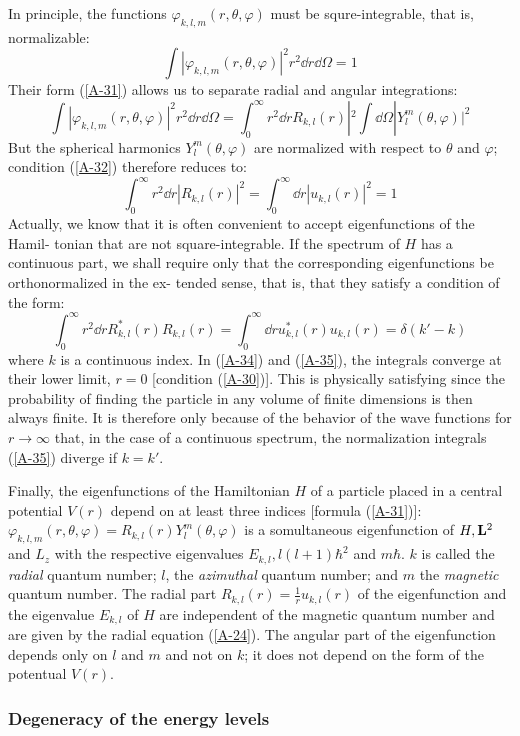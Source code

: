 In principle, the functions $\varphi_{k,l,m}(r,\theta,\varphi)$ must be squre-integrable, that is, normalizable:
\begin{equation}\label{A-32}
	\int |\varphi_{k,l,m}(r,\theta,\varphi)|^2r^2\dd r\dd \Omega = 1
\end{equation}
Their form (\ref{A-31}) allows us to separate radial and angular integrations:
\begin{equation}\label{A-33}
	\int |\varphi_{k,l,m}(r,\theta,\varphi)|^2r^2\dd r\dd \Omega =\int_0^\infty r^2\dd r R_{k,l}(r)|^2\int \dd\Omega |Y_l^m(\theta,\varphi)|^2
\end{equation}
But the spherical harmonics $Y_l^m(\theta,\varphi)$ are normalized with respect to $\theta$ and $\varphi$; condition (\ref{A-32}) therefore reduces to:
\begin{equation}\label{A-34}
	\int_0^\infty r^2\dd r |R_{k,l}(r)|^2=\int_0^\infty \dd r |u_{k,l}(r)|^2=1
\end{equation}
Actually, we know that it is often convenient to accept eigenfunctions of the Hamil- tonian that are not square-integrable. If the spectrum of $H$ has a continuous part, we shall require only that the corresponding eigenfunctions be orthonormalized in the ex- tended sense, that is, that they satisfy a condition of the form:
\begin{equation}\label{A-35}
	\int_0^\infty r^2\dd r R_{k,l}^*(r)R_{k,l}(r)=\int_0^\infty \dd r u_{k,l}^*(r)u_{k,l}(r)=\delta(k'-k)
\end{equation}
where $k$ is a continuous index.
In (\ref{A-34}) and (\ref{A-35}), the integrals converge at their lower limit, $r=0$ [condition (\ref{A-30})]. This is physically satisfying since the probability of finding the particle in any volume of finite dimensions is then always finite. It is therefore only because of the behavior of the wave functions for $r\to \infty$ that, in the case of a continuous spectrum, the normalization integrals (\ref{A-35}) diverge if $k=k'$.

Finally, the eigenfunctions of the Hamiltonian $H$ of a particle placed in a central potential $V(r)$ depend on at least three indices [formula (\ref{A-31})]: $\varphi_{k,l,m}(r,\theta,\varphi)=R_{k,l}(r)Y_l^m(\theta,\varphi)$ is a somultaneous eigenfunction of $H, \vb{L}^2$ and $L_z$ with the respective eigenvalues $E_{k,l}, l(l+1)\hbar^2$ and $m\hbar$. $k$ is called the \textit{radial} quantum number; $l$, the \textit{azimuthal} quantum number; and $m$ the \textit{magnetic} quantum number. The radial part $R_{k,l}(r)=\frac{1}{r}u_{k,l}(r)$ of the eigenfunction and the eigenvalue $E_{k,l}$ of $H$ are independent of the magnetic quantum number and are given by the radial equation (\ref{A-24}). The angular part of the eigenfunction depends only on $l$ and $m$ and not on $k$; it does not depend on the form of the potentual $V(r)$.

\subsubsection{Degeneracy of the energy levels}
























